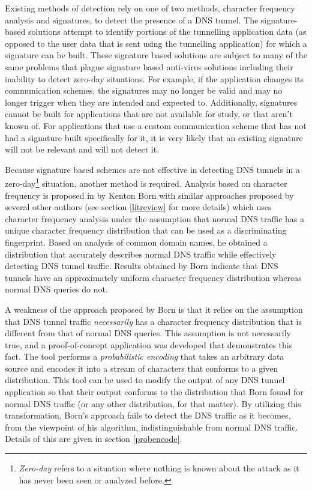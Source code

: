 \documentclass[12pt]{article}
\theoremstyle{remark}
\theoremstyle{definition}
\theoremstyle{definition}
\theoremstyle{definition}
\begin{document}
Existing methods of detection rely on one of two methods, character frequency
analysis
and signatures, to detect the presence of a DNS tunnel. The signature-based
solutions attempt to identify portions of the tunnelling
application data (as opposed to the user data that is sent using the tunnelling
application) for which a signature can be built. These signature based
solutions are subject to many of the same problems that plague signature based
anti-virus solutions including their inability to detect zero-day situations.
 For example, if the application changes its communication
schemes, the signatures may no longer be valid and may no longer trigger when
they are intended and expected to. Additionally, signatures cannot be built for
applications
that are not available for study, or that aren't known of. For applications
that use a custom communication scheme that has not had a signature built
specifically for it, it is very likely that an existing signature will not be
relevant and will not detect it.

Because signature based schemes are not effective in detecting DNS tunnels in a
zero-day\footnote{\emph{Zero-day} refers to a situation where nothing is
known about the attack as it has never been seen or analyzed before.} situation,
another
method is required. Analysis based on character frequency is proposed
in\cite{Born2010.cfa} by Kenton Born with similar approaches proposed by several
other authors (see section \ref{litreview} for more details) which uses
character
frequency analysis under the assumption that normal DNS traffic has a unique
character frequency distribution that can be used as a discriminating
fingerprint. Based on analysis of common domain names, he obtained a
distribution that accurately describes normal DNS traffic while
effectively detecting DNS tunnel traffic. Results obtained by Born indicate
that DNS tunnels have an approximately uniform character frequency distribution
whereas normal DNS queries do not.

A weakness of the approach proposed by Born is that it relies on the assumption
that DNS tunnel traffic \emph{necessarily} has a character frequency
distribution that is different from that of normal DNS queries. This assumption
is not necessarily true, and a proof-of-concept application
was developed that demonstrates this fact. The tool performs a
\emph{probabilistic encoding} that takes an arbitrary data source and encodes
it into a stream of characters that conforms to a given distribution. This tool
can be used to modify the output of any DNS tunnel application so that their
output conforms to the distribution that Born found for normal DNS traffic (or
any other distribution, for that matter). By
utilizing this transformation, Born's approach fails to detect the DNS traffic
as it becomes, from the viewpoint of his algorithm, indistinguishable from
normal DNS traffic. Details of this are given in section \ref{probencode}.
\end{document}
